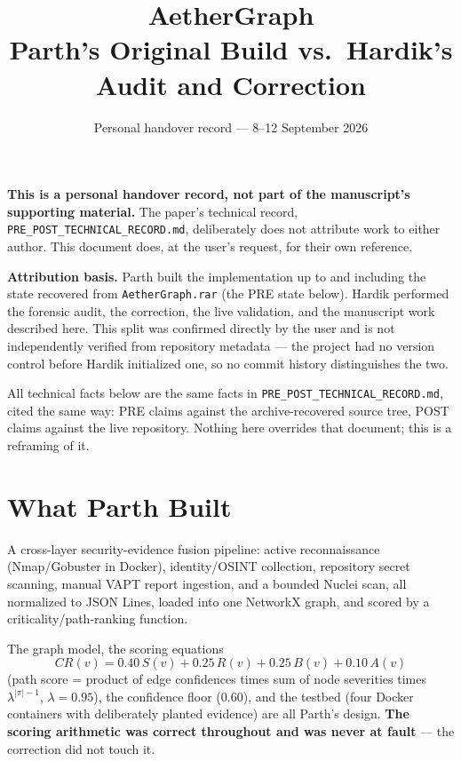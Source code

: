 \documentclass[11pt,a4paper]{article}
\title{\textbf{AetherGraph}\\[4pt]\large Parth's Original Build vs.\ Hardik's Audit and Correction}
\author{}
\date{Personal handover record --- 8--12 September 2026}
\begin{document}
\maketitle
\vspace{-2em}

\begin{tcolorbox}[colback=noteBg, colframe=gray!50, breakable, boxrule=0.4pt]
\textbf{This is a personal handover record, not part of the manuscript's supporting material.} The paper's technical record, \texttt{PRE\_POST\_TECHNICAL\_RECORD.md}, deliberately does not attribute work to either author. This document does, at the user's request, for their own reference.

\textbf{Attribution basis.} Parth built the implementation up to and including the state recovered from \texttt{AetherGraph.rar} (the PRE state below). Hardik performed the forensic audit, the correction, the live validation, and the manuscript work described here. This split was confirmed directly by the user and is not independently verified from repository metadata --- the project had no version control before Hardik initialized one, so no commit history distinguishes the two.

All technical facts below are the same facts in \texttt{PRE\_POST\_TECHNICAL\_RECORD.md}, cited the same way: PRE claims against the archive-recovered source tree, POST claims against the live repository. Nothing here overrides that document; this is a reframing of it.
\end{tcolorbox}

\section{What Parth Built}

A cross-layer security-evidence fusion pipeline: active reconnaissance (Nmap/Gobuster in Docker), identity/OSINT collection, repository secret scanning, manual VAPT report ingestion, and a bounded Nuclei scan, all normalized to JSON Lines, loaded into one NetworkX graph, and scored by a criticality/path-ranking function.

The graph model, the scoring equations
\[
CR(v) = 0.40\,S(v) + 0.25\,R(v) + 0.25\,B(v) + 0.10\,A(v)
\]
(path score = product of edge confidences times sum of node severities times $\lambda^{|\pi|-1}$, $\lambda=0.95$), the confidence floor ($0.60$), and the testbed (four Docker containers with deliberately planted evidence) are all Parth's design. \textbf{The scoring arithmetic was correct throughout and was never at fault} --- the correction did not touch it.
\end{document}
